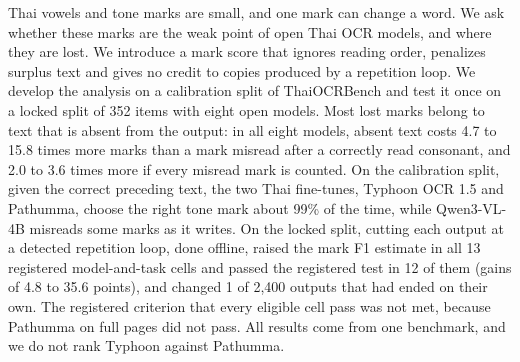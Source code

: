 Thai vowels and tone marks are small, and one mark can change a word. We ask whether these marks are the weak point of open Thai OCR models, and where they are lost. We introduce a mark score that ignores reading order, penalizes surplus text and gives no credit to copies produced by a repetition loop. We develop the analysis on a calibration split of ThaiOCRBench and test it once on a locked split of 352 items with eight open models. Most lost marks belong to text that is absent from the output: in all eight models, absent text costs 4.7 to 15.8 times more marks than a mark misread after a correctly read consonant, and 2.0 to 3.6 times more if every misread mark is counted. On the calibration split, given the correct preceding text, the two Thai fine-tunes, Typhoon OCR 1.5 and Pathumma, choose the right tone mark about 99\% of the time, while Qwen3-VL-4B misreads some marks as it writes. On the locked split, cutting each output at a detected repetition loop, done offline, raised the mark F1 estimate in all 13 registered model-and-task cells and passed the registered test in 12 of them (gains of 4.8 to 35.6 points), and changed 1 of 2,400 outputs that had ended on their own. The registered criterion that every eligible cell pass was not met, because Pathumma on full pages did not pass. All results come from one benchmark, and we do not rank Typhoon against Pathumma.
